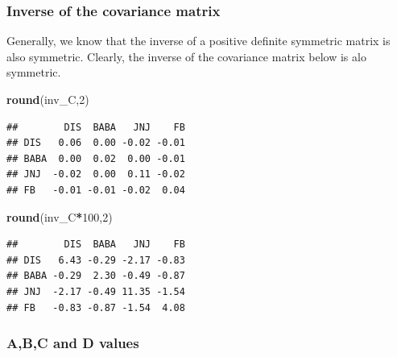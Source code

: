 \documentclass[]{article}
\newenvironment{Shaded}{\begin{snugshade}}{\end{snugshade}}
\newcommand{\KeywordTok}[1]{\textcolor[rgb]{0.13,0.29,0.53}{\textbf{#1}}}
\newcommand{\DecValTok}[1]{\textcolor[rgb]{0.00,0.00,0.81}{#1}}
\newcommand{\OperatorTok}[1]{\textcolor[rgb]{0.81,0.36,0.00}{\textbf{#1}}}
\newcommand{\NormalTok}[1]{#1}
\begin{document}
\subsubsection{Inverse of the covariance
matrix}\label{inverse-of-the-covariance-matrix}

Generally, we know that the inverse of a positive definite symmetric
matrix is also symmetric. Clearly, the inverse of the covariance matrix
below is alo symmetric.

\begin{Shaded}
\begin{Highlighting}[]
\KeywordTok{round}\NormalTok{(inv_C,}\DecValTok{2}\NormalTok{)}
\end{Highlighting}
\end{Shaded}

\begin{verbatim}
##        DIS  BABA   JNJ    FB
## DIS   0.06  0.00 -0.02 -0.01
## BABA  0.00  0.02  0.00 -0.01
## JNJ  -0.02  0.00  0.11 -0.02
## FB   -0.01 -0.01 -0.02  0.04
\end{verbatim}

\begin{Shaded}
\begin{Highlighting}[]
\KeywordTok{round}\NormalTok{(inv_C}\OperatorTok{*}\DecValTok{100}\NormalTok{,}\DecValTok{2}\NormalTok{)}
\end{Highlighting}
\end{Shaded}

\begin{verbatim}
##        DIS  BABA   JNJ    FB
## DIS   6.43 -0.29 -2.17 -0.83
## BABA -0.29  2.30 -0.49 -0.87
## JNJ  -2.17 -0.49 11.35 -1.54
## FB   -0.83 -0.87 -1.54  4.08
\end{verbatim}

\subsubsection{A,B,C and D values}\label{abc-and-d-values}
\end{document}
